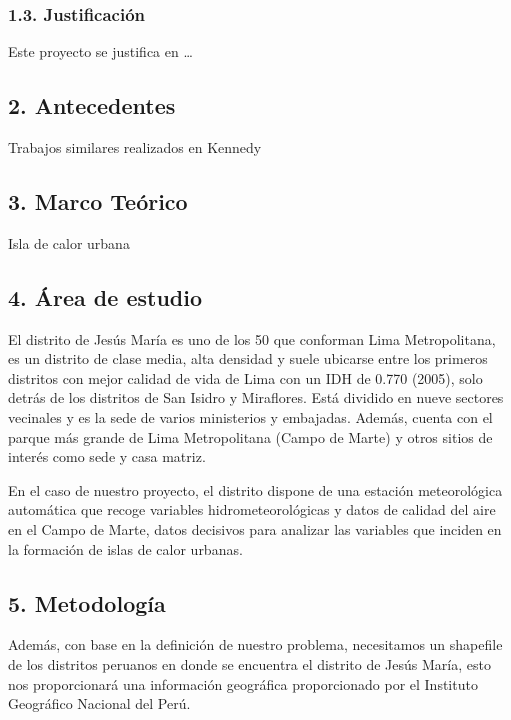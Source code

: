 \documentclass[
]{article}
\begin{document}
\hypertarget{justificaciuxf3n}{%
\subsubsection{1.3. Justificación}\label{justificaciuxf3n}}

Este proyecto se justifica en \ldots{}

\hypertarget{antecedentes}{%
\subsection{2. Antecedentes}\label{antecedentes}}

Trabajos similares realizados en Kennedy

\hypertarget{marco-teuxf3rico}{%
\subsection{3. Marco Teórico}\label{marco-teuxf3rico}}

Isla de calor urbana

\hypertarget{uxe1rea-de-estudio}{%
\subsection{4. Área de estudio}\label{uxe1rea-de-estudio}}

El distrito de Jesús María es uno de los 50 que conforman Lima
Metropolitana, es un distrito de clase media, alta densidad y suele
ubicarse entre los primeros distritos con mejor calidad de vida de Lima
con un IDH de 0.770 (2005), solo detrás de los distritos de San Isidro y
Miraflores. Está dividido en nueve sectores vecinales y es la sede de
varios ministerios y embajadas. Además, cuenta con el parque más grande
de Lima Metropolitana (Campo de Marte) y otros sitios de interés como
sede y casa matriz.

En el caso de nuestro proyecto, el distrito dispone de una estación
meteorológica automática que recoge variables hidrometeorológicas y
datos de calidad del aire en el Campo de Marte, datos decisivos para
analizar las variables que inciden en la formación de islas de calor
urbanas.

\hypertarget{metodologuxeda}{%
\subsection{5. Metodología}\label{metodologuxeda}}

Además, con base en la definición de nuestro problema, necesitamos un
shapefile de los distritos peruanos en donde se encuentra el distrito de
Jesús María, esto nos proporcionará una información geográfica
proporcionado por el Instituto Geográfico Nacional del Perú.
\end{document}
